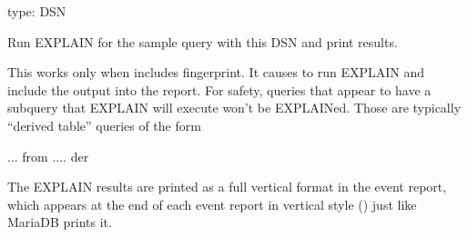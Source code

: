 \documentclass[letterpaper,10pt,english]{sphinxmanual}
\begin{document}
\begin{fulllineitems}
\label{\detokenize{mariadb-query-digest:cmdoption-mariadb-query-digest-explain}}
type: DSN

Run EXPLAIN for the sample query with this DSN and print results.

This works only when {\hyperref[\detokenize{mariadb-query-digest:cmdoption-mariadb-query-digest-group-by}]{}} includes fingerprint.  It causes
 to run EXPLAIN and include the output into the report.  For
safety, queries that appear to have a subquery that EXPLAIN will execute won’t
be EXPLAINed.  Those are typically “derived table” queries of the form

\begin{sphinxVerbatim}[commandchars=\\\{\}]
 ... from   ....  der
\end{sphinxVerbatim}

The EXPLAIN results are printed as a full vertical format in the event report,
which appears at the end of each event report in vertical style
() just like MariaDB prints it.

\end{fulllineitems}

\end{document}
